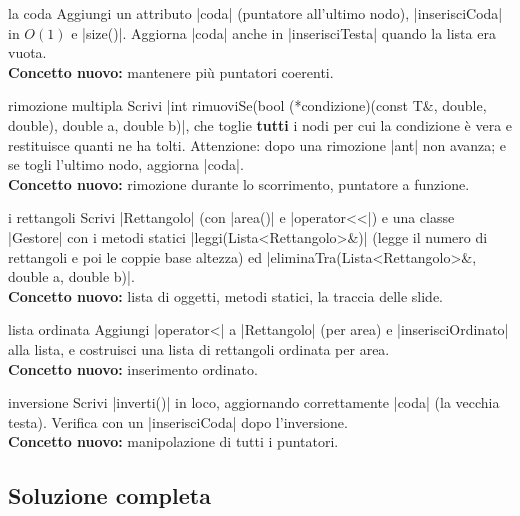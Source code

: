 \begin{step}{la coda}
Aggiungi un attributo \cc|coda| (puntatore all'ultimo nodo), \cc|inserisciCoda| in
$O(1)$ e \cc|size()|. Aggiorna \cc|coda| anche in \cc|inserisciTesta| quando la lista era
vuota.\\[0.3em]
\textbf{Concetto nuovo:} mantenere più puntatori coerenti.
\end{step}

\begin{step}{rimozione multipla}
Scrivi \cc|int rimuoviSe(bool (*condizione)(const T&, double, double), double a, double b)|,
che toglie \textbf{tutti} i nodi per cui la condizione è vera e restituisce quanti ne ha
tolti. Attenzione: dopo una rimozione \cc|ant| non avanza; e se togli l'ultimo nodo,
aggiorna \cc|coda|.\\[0.3em]
\textbf{Concetto nuovo:} rimozione durante lo scorrimento, puntatore a funzione.
\end{step}

\begin{step}{i rettangoli}
Scrivi \cc|Rettangolo| (con \cc|area()| e \cc|operator<<|) e una classe \cc|Gestore| con i
metodi statici \cc|leggi(Lista<Rettangolo>&)| (legge il numero di rettangoli e poi le
coppie base altezza) ed \cc|eliminaTra(Lista<Rettangolo>&, double a, double b)|.\\[0.3em]
\textbf{Concetto nuovo:} lista di oggetti, metodi statici, la traccia delle slide.
\end{step}

\begin{step}{lista ordinata}
Aggiungi \cc|operator<| a \cc|Rettangolo| (per area) e \cc|inserisciOrdinato| alla lista,
e costruisci una lista di rettangoli ordinata per area.\\[0.3em]
\textbf{Concetto nuovo:} inserimento ordinato.
\end{step}

\begin{step}{inversione}
Scrivi \cc|inverti()| in loco, aggiornando correttamente \cc|coda| (la vecchia testa).
Verifica con un \cc|inserisciCoda| dopo l'inversione.\\[0.3em]
\textbf{Concetto nuovo:} manipolazione di tutti i puntatori.
\end{step}

\subsection*{Soluzione completa}

